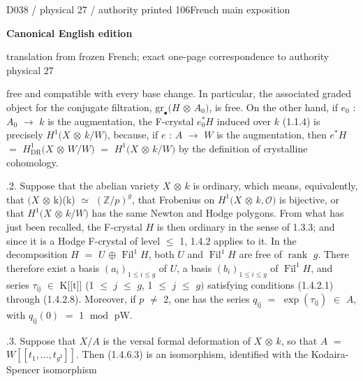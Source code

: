 \documentclass[9pt]{article}
\newcommand{\CanonText}[1]{\par{\fontsize{8.0}{9.35}\selectfont\RaggedRight #1\par}\vspace{2.2pt}}
\newcommand{\LayerTitle}{Canonical English edition}
\begin{document}
\noindent\begin{minipage}[t][\dimexpr\textheight-5pt\relax][t]{\textwidth}
{\sffamily\fontsize{7.3}{8.2}\selectfont\color{Quiet} D038 / physical 27 / authority printed 106\hfill French main exposition}
\par{}\vspace{4.5pt}
{\sffamily\fontsize{10.4}{11.6}\selectfont\bfseries\color{Accent} \LayerTitle}
\par{\sffamily\fontsize{6.7}{7.7}\selectfont\color{Quiet} translation from frozen French; exact one-page correspondence to authority physical 27}
\vspace{5pt}
\CanonText{free and compatible with every base change. In particular, the associated graded object for the conjugate filtration, \(\text{gr}_\bullet{}(H\) \(\otimes{}\) \(A_{0})\), is free. On the other hand, if \(e_{0}\) : \(A_{0}\) \(\to{}\) \(k\) is the augmentation, the F-crystal \(e_{0}^{*}H\) induced over \(k\) (1.1.4) is precisely \(H^{1}(X\) \(\otimes{}\) \(k/W)\), because, if \(e\) : \(A\) \(\to{}\) \(W\) is the augmentation, then \(e^{*}H\) \(=\) \(H^{1}_{\mathrm{DR}}(X\) \(\otimes{}\) \(W/W)\) \(=\) \(H^{1}(X\) \(\otimes{}\) \(k/W)\) by the definition of crystalline cohomology.}
\CanonText{2.1.2. Suppose that the abelian variety \(X\) \(\otimes{}\) \(k\) is ordinary, which means, equivalently, that \((X\) \(\otimes{}\) k)(k) \(\simeq{}\) \((\mathbb{Z}/p)^{g}\), that Frobenius on \(H^{1}(X\) \(\otimes{}\) \(k,\mathcal{O})\) is bijective, or that \(H^{1}(X\) \(\otimes{}\) \(k/W)\) has the same Newton and Hodge polygons. From what has just been recalled, the F-crystal \(H\) is then ordinary in the sense of 1.3.3; and since it is a Hodge F-crystal of level \(\leq{}\) 1, 1.4.2 applies to it. In the decomposition \(H\) \(=\) \(U\) \(\oplus{}\) \(\operatorname{Fil}^{1}H\), both \(U\) and \(\operatorname{Fil}^{1}H\) are free of \(\operatorname{rank}\) \(g\). There therefore exist a basis \((a_{i})_{1\leq{}i\leq{}g}\) of \(U\), a basis \((b_{i})_{1\leq{}i\leq{}g}\) of \(\operatorname{Fil}^{1}H\), and series \(\tau{}_{\mathrm{ij}}\) \(\in{}\) K[[t]] (1 \(\leq{}\) \(j\) \(\leq{}\) \(g\), 1 \(\leq{}\) \(j\) \(\leq{}\) \(g)\) satisfying conditions (1.4.2.1) through (1.4.2.8). Moreover, if \(p\) \(\neq{}\) 2, one has the series \(q_{\mathrm{ij}}\) \(=\) \(\operatorname{exp}(\tau{}_{\mathrm{ij}})\) \(\in{}\) \(A\), with \(q_{\mathrm{ij}}(0)\) \(=\) 1 \(\operatorname{mod}\) pW.}
\CanonText{2.1.3. Suppose that \(X/A\) is the versal formal deformation of \(X\) \(\otimes{}\) \(k\), so that \(A\) \(=\) \(W[[t_{1},\ldots{},t_{g^{2}}]]\). Then (1.4.6.3) is an isomorphism, identified with the Kodaira-Spencer isomorphism}

\end{minipage}
\end{document}
